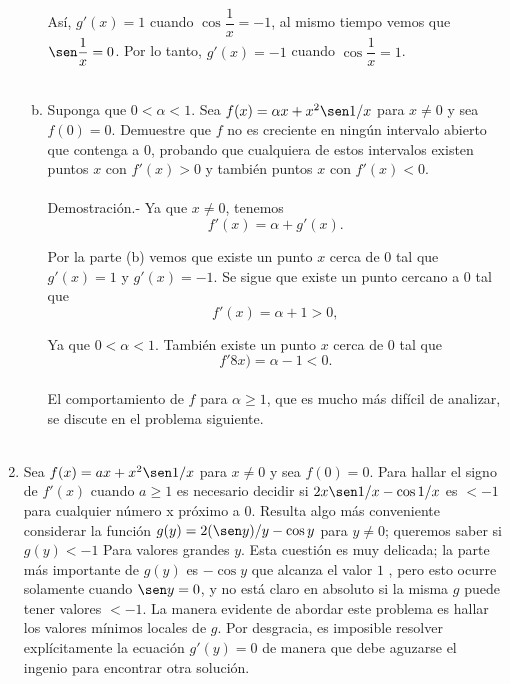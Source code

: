 \begin{enumerate}[\bfseries 1.]
\begin{enumerate}[(a)]
		Así, $g'(x)=1$ cuando $\cos\dfrac{1}{x}=-1$, al mismo tiempo vemos que $\sen\dfrac{1}{x}=0$. Por lo tanto, $g'(x)=-1$ cuando $\cos \dfrac{1}{x}=1$.\\\\

	    \item Suponga que $0<\alpha<1$. Sea $f(x)=\alpha x+x^2\sen 1/x$ para $x\neq 0$ y sea $f(0)=0$. Demuestre que $f$ no es creciente en ningún intervalo abierto que contenga a $0$, probando que cualquiera de estos intervalos existen puntos $x$ con $f'(x)>0$ y también puntos $x$ con $f'(x)<0$.\\\\
		Demostración.-\; Ya que $x\neq 0$, tenemos
		$$f'(x)=\alpha+g'(x).$$

		Por la parte (b) vemos que existe un punto $x$ cerca de $0$ tal que $g'(x)=1$ y $g'(x)=-1$. Se sigue que existe un punto cercano a $0$ tal que 
		$$f'(x)=\alpha+1>0,$$

		Ya que $0<\alpha<1$. También existe un punto $x$ cerca de $0$ tal que
		$$f'8x)=\alpha-1<0.$$\\


		El comportamiento de $f$ para $\alpha\geq 1$, que es mucho más difícil de analizar, se discute en el problema siguiente.\\\\
	\end{enumerate}

    \item Sea $f(x) = ax + x^2 \sen 1/x$ para $x\neq 0$ y sea $f(0)=0$. Para hallar el signo de $f'(x)$ cuando $a \geq 1$ es necesario decidir si $2x \sen 1/x -\cos 1/x$ es $< -1$ para cualquier número x próximo a $0$. Resulta algo más conveniente considerar la función $g(y) = 2 (\sen y)/y -\cos y$ para $y \neq 0$; queremos saber si $g(y) < - 1$ Para valores grandes $y$. Esta cuestión es muy delicada; la parte más importante de $g(y)$ es $-\cos y$ que alcanza el valor $1$ , pero esto ocurre solamente cuando $\sen y = 0$, y no está claro en absoluto si la misma $g$ puede tener valores $< -1$. La manera evidente de abordar este problema es hallar los valores mínimos locales de $g$. Por desgracia, es imposible resolver explícitamente la ecuación $g'(y) = 0$ de manera que debe aguzarse el ingenio para encontrar otra solución.\\\\

	\begin{enumerate}[(a)]


\end{enumerate}
\end{enumerate}
